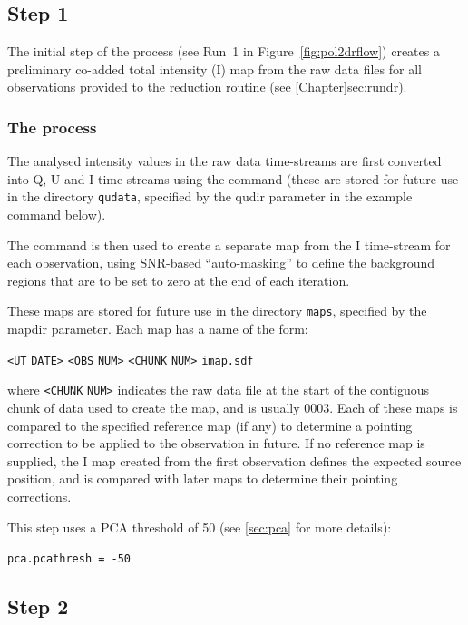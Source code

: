 \subsection*{Step 1}

The initial step of the process (see Run~1 in Figure~\ref{fig:pol2drflow})
creates a preliminary co-added total intensity
(I) map from the raw data files for all observations provided to the
reduction routine (see \cref{Chapter}{sec:rundr}{}).


\subsubsection*{The process}
The analysed intensity values in the raw data time-streams are first
converted into Q, U and I time-streams using the
 command (these are stored
for future use in the directory \texttt{qudata}, specified by the
qudir parameter in the example command below).

The  command is then used to
create a separate map from the I time-stream for each observation,
using SNR-based ``auto-masking'' to define the background regions that
are to be set to zero at the end of each iteration.

These maps are stored for future use in the directory \texttt{maps},
specified by the mapdir parameter. Each map has a name of the form:

\texttt{<UT$\_$DATE>$\_$<OBS$\_$NUM>$\_$<CHUNK$\_$NUM>$\_$imap.sdf}

where \texttt{<CHUNK$\_$NUM>} indicates the raw data file at the start
of the contiguous chunk of data used to create the map, and is usually
0003.  Each of these maps is compared to the specified reference map
(if any) to determine a pointing correction to be applied to the
observation in future. If no reference map is supplied, the I map
created from the first observation defines the expected source
position, and is compared with later maps to determine their pointing
corrections.

This step uses a PCA threshold of 50 (see \ref{sec:pca} for more details):

\texttt{pca.pcathresh = -50}



\subsection*{Step 2}

